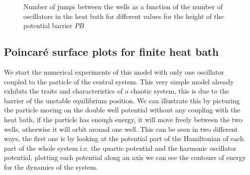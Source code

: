 \begin{figure}[H]%
    \centering
    \qquad
    \caption{Number of jumps between the wells as a function of the number of oscillators in the heat bath for different values for the height of the potential barrier $PB$}%
    \label{fig:changing_PB}%
\end{figure}


\subsection{Poincaré surface plots for finite heat bath}
We start the numerical experiments of this model with only one oscillator coupled to the particle of the central system. This very simple model already exhibits the traits and characteristics of a chaotic system, this is due to the barrier of the unstable equilibrium position. We can illustrate this by picturing the particle moving on the double well potential without any coupling with the heat bath, if the particle has enough energy, it will move freely between the two wells, otherwise it will orbit around one well. This can be seen in two different ways, the first one is by looking at the potential part of the Hamiltonian of each part of the whole system i.e. the quartic potential and the harmonic oscillator potential, plotting each potential along an axis we can see the contours of energy for the dynamics of the system.

